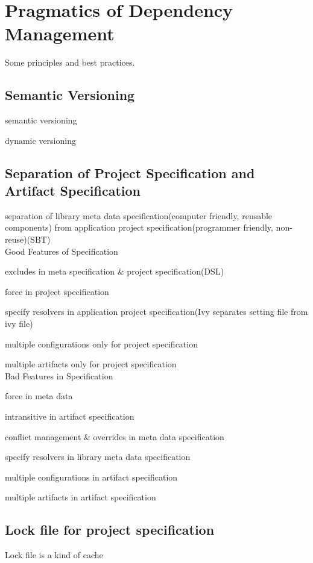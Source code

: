 \section{Pragmatics of Dependency Management}

Some principles and best practices.

\subsection{Semantic Versioning}

semantic versioning

dynamic versioning

\subsection{Separation of Project Specification and Artifact Specification}

separation of library meta data specification(computer friendly, reusable components) from application project specification(programmer friendly, non-reuse)(SBT)\\

{\sc Good Features of Specification}

excludes in meta specification \& project specification(DSL)

force in project specification

specify resolvers in application project specification(Ivy separates setting file from ivy file)

multiple configurations only for project specification

multiple artifacts only for project specification\\

{\sc Bad Features in Specification}

force in meta data

intransitive in artifact specification

conflict management \& overrides in meta data specification

specify resolvers in library meta data specification

multiple configurations in artifact specification

multiple artifacts in artifact specification

\subsection{Lock file for project specification}

Lock file is a kind of cache
